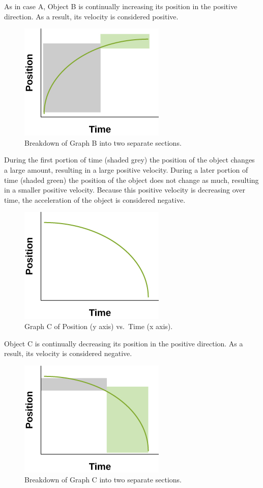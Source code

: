 \documentclass[
]{book}
\begin{document}
As in case A, Object B is continually increasing its position in the
positive direction. As a result, its velocity is considered positive.

\begin{figure}
\hypertarget{fs-id3195153}{%
\centering
\includegraphics{images/Figure_Ch2_M4_11.jpg}
\caption{Breakdown of Graph B into two separate
sections.}\label{fs-id3195153}
}
\end{figure}

During the first portion of time (shaded grey) the position of the
object changes a large amount, resulting in a large positive velocity.
During a later portion of time (shaded green) the position of the object
does not change as much, resulting in a smaller positive velocity.
Because this positive velocity is decreasing over time, the acceleration
of the object is considered negative.

\begin{figure}
\hypertarget{fs-id2059002}{%
\centering
\includegraphics{images/Figure_Ch2_M4_12.jpg}
\caption{Graph C of Position (y axis) vs.~Time (x
axis).}\label{fs-id2059002}
}
\end{figure}

Object C is continually decreasing its position in the positive
direction. As a result, its velocity is considered negative.

\begin{figure}
\hypertarget{fs-id2387653}{%
\centering
\includegraphics{images/Figure_Ch2_M4_13.jpg}
\caption{Breakdown of Graph C into two separate
sections.}\label{fs-id2387653}
}
\end{figure}
\end{document}
